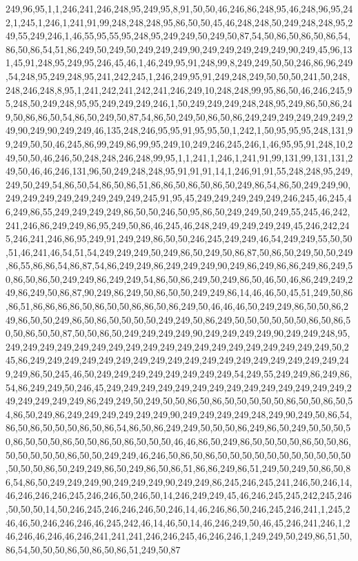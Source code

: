 249,96,95,1,1,246,241,246,248,95,249,95,8,91,50,50,46,246,86,248,95,46,248,96,95,242,1,245,1,246,1,241,91,99,248,248,248,95,86,50,50,45,46,248,248,50,249,248,248,95,249,55,249,246,1,46,55,95,55,95,248,95,249,249,50,249,50,87,54,50,86,50,86,50,86,54,86,50,86,54,51,86,249,50,249,50,249,249,249,90,249,249,249,249,249,90,249,45,96,131,45,91,248,95,249,95,246,45,46,1,46,249,95,91,248,99,8,249,249,50,50,246,86,96,249,54,248,95,249,248,95,241,242,245,1,246,249,95,91,249,248,249,50,50,50,241,50,248,248,246,248,8,95,1,241,242,241,242,241,246,249,10,248,248,99,95,86,50,46,246,245,95,248,50,249,248,95,95,249,249,249,246,1,50,249,249,249,248,248,95,249,86,50,86,249,50,86,86,50,54,86,50,249,50,87,54,86,50,249,50,86,50,86,249,249,249,249,249,249,249,90,249,90,249,249,46,135,248,246,95,95,91,95,95,50,1,242,1,50,95,95,95,248,131,99,249,50,50,46,245,86,99,249,86,99,95,249,10,249,246,245,246,1,46,95,95,91,248,10,249,50,50,46,246,50,248,248,246,248,99,95,1,1,241,1,246,1,241,91,99,131,99,131,131,249,50,46,46,246,131,96,50,249,248,248,95,91,91,91,14,1,246,91,91,55,248,248,95,249,249,50,249,54,86,50,54,86,50,86,51,86,86,50,86,50,86,50,249,86,54,86,50,249,249,90,249,249,249,249,249,249,249,249,245,91,95,45,249,249,249,249,249,246,245,46,245,46,249,86,55,249,249,249,249,86,50,50,246,50,95,86,50,249,249,50,249,55,245,46,242,241,246,86,249,249,86,95,249,50,86,46,245,46,248,249,49,249,249,249,45,246,242,245,246,241,246,86,95,249,91,249,249,86,50,50,246,245,249,249,46,54,249,249,55,50,50,51,46,241,46,54,51,54,249,249,249,50,249,86,50,249,50,86,87,50,86,50,249,50,50,249,86,55,86,86,54,86,87,54,86,249,249,86,249,249,249,90,249,86,249,86,86,249,86,249,50,86,50,86,50,249,249,86,249,249,54,86,50,86,249,50,249,86,50,46,50,46,86,249,249,249,86,249,50,86,87,90,249,86,249,50,86,50,50,249,249,86,14,46,46,50,45,51,249,50,86,86,51,86,86,86,86,50,86,50,50,86,86,50,86,249,50,46,46,46,50,249,249,86,50,50,86,249,86,50,50,249,86,50,86,50,50,50,50,249,249,50,86,249,50,50,50,50,50,50,86,50,86,50,50,86,50,50,87,50,50,86,50,249,249,249,249,90,249,249,249,249,90,249,249,248,95,249,249,249,249,249,249,249,249,249,249,249,249,249,249,249,249,249,249,249,50,245,86,249,249,249,249,249,249,249,249,249,249,249,249,249,249,249,249,249,249,249,249,86,50,245,46,50,249,249,249,249,249,249,249,249,54,249,55,249,249,86,249,86,54,86,249,249,50,246,45,249,249,249,249,249,249,249,249,249,249,249,249,249,249,249,249,249,249,249,86,249,249,50,249,50,50,86,50,86,50,50,50,50,50,86,50,50,86,50,54,86,50,249,86,249,249,249,249,249,249,90,249,249,249,249,248,249,90,249,50,86,54,86,50,86,50,50,50,86,50,86,54,86,50,86,249,249,50,50,50,86,249,86,50,249,50,50,50,50,86,50,50,50,86,50,50,86,50,86,50,50,50,46,46,86,50,249,86,50,50,50,50,86,50,50,86,50,50,50,50,50,86,50,50,249,249,46,246,50,86,50,86,50,50,50,50,50,50,50,50,50,50,50,50,50,50,86,50,249,249,86,50,249,86,50,86,51,86,86,249,86,51,249,50,249,50,86,50,86,54,86,50,249,249,249,90,249,249,249,90,249,249,86,245,246,245,241,246,50,246,14,46,246,246,246,245,246,246,50,246,50,14,246,249,249,45,46,246,245,245,242,245,246,50,50,50,14,50,246,245,246,246,246,50,246,14,46,246,86,50,246,245,246,241,1,245,246,46,50,246,246,246,46,245,242,46,14,46,50,14,46,246,249,50,46,45,246,241,246,1,246,246,46,246,46,246,241,241,241,246,246,245,46,246,246,1,249,249,50,249,86,51,50,86,54,50,50,50,86,50,86,50,86,51,249,50,87
